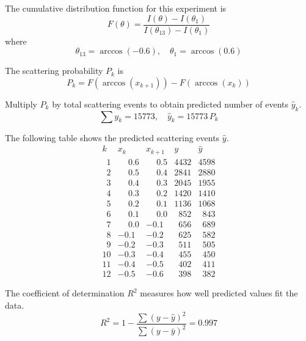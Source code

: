 The cumulative distribution function for this experiment is
\begin{equation*}
F(\theta)=\frac{I(\theta)-I(\theta_1)}
{I(\theta_{13})-I(\theta_1)}
\end{equation*}
where
\begin{equation*}
\theta_{13}=\arccos(-0.6),
\quad
\theta_1=\arccos(0.6)
\end{equation*}

The scattering probability $P_k$ is
\begin{equation*}
P_k=F\left(\arccos(x_{k+1})\right)-F\left(\arccos(x_k)\right)
\end{equation*}

Multiply $P_k$ by total scattering events to obtain predicted number of events $\hat y_k$.
\begin{equation*}
\sum y_k=15773,\quad \hat y_k=15773\,P_k
\end{equation*}

The following table shows the predicted scattering events $\hat y$.
\begin{equation*}
\begin{matrix}
k & x_k & x_{k+1} & y & \hat y\\
\phantom01 & \phantom+0.6 & \phantom+0.5 & 4432 & 4598\\
\phantom02 & \phantom+0.5 & \phantom+0.4 & 2841 & 2880\\
\phantom03 & \phantom+0.4 & \phantom+0.3 & 2045 & 1955\\
\phantom04 & \phantom+0.3 & \phantom+0.2 & 1420 & 1410\\
\phantom05 & \phantom+0.2 & \phantom+0.1 & 1136 & 1068\\
\phantom06 & \phantom+0.1 & \phantom+0.0 & \phantom0852 & \phantom0843\\
\phantom07 & \phantom+0.0 & -0.1 & \phantom0656 & \phantom0689\\
\phantom08 & -0.1 & -0.2 & \phantom0625 & \phantom0582\\
\phantom09 & -0.2 & -0.3 & \phantom0511 & \phantom0505\\
10 & -0.3 & -0.4 & \phantom0455 & \phantom0450\\
11 & -0.4 & -0.5 & \phantom0402 & \phantom0411\\
12 & -0.5 & -0.6 & \phantom0398 & \phantom0382
\end{matrix}
\end{equation*}

The coefficient of determination $R^2$ measures how well predicted values fit the data.
\begin{equation*}
R^2=1-\frac{\sum(y-\hat y)^2}{\sum(y-\bar y)^2}=0.997
\end{equation*}

